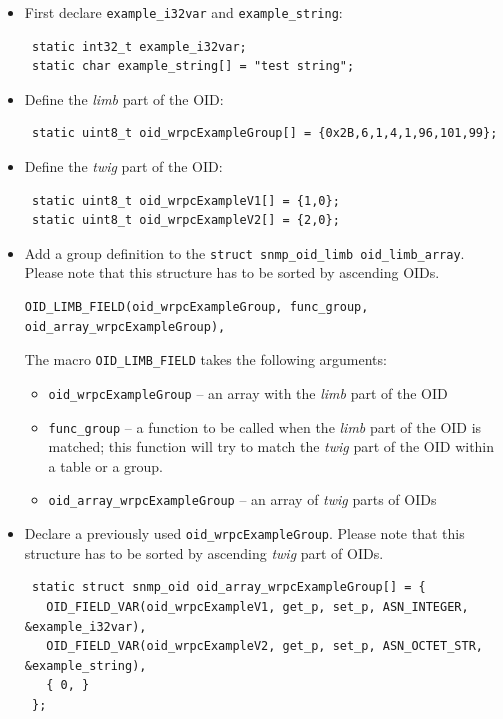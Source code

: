 \documentclass[a4paper, 12pt]{article}
\begin{document}
\begin{itemize}
\item First declare \texttt{example\_i32var} and \texttt{example\_string}:
\begin{lstlisting}
 static int32_t example_i32var;
 static char example_string[] = "test string";
\end{lstlisting}

\item Define the \textit{limb} part of the OID:
\begin{lstlisting}
 static uint8_t oid_wrpcExampleGroup[] = {0x2B,6,1,4,1,96,101,99};
\end{lstlisting}

\item Define the \textit{twig} part of the OID:
\begin{lstlisting}
 static uint8_t oid_wrpcExampleV1[] = {1,0};
 static uint8_t oid_wrpcExampleV2[] = {2,0};
\end{lstlisting}

\item Add a group definition to the \texttt{struct snmp\_oid\_limb oid\_limb\_array}.
      Please note that this structure has to be sorted by ascending OIDs.
\begin{lstlisting}
OID_LIMB_FIELD(oid_wrpcExampleGroup, func_group, oid_array_wrpcExampleGroup),
\end{lstlisting}
The macro \texttt{OID\_LIMB\_FIELD} takes the following arguments:
\begin{itemize}
   \item \texttt{oid\_wrpcExampleGroup} -- an array with the \textit{limb} part of the
         OID
   \item \texttt{func\_group} -- a function to be called when the \textit{limb} part of
         the OID is matched; this function will try to match the \textit{twig} part
         of the OID within a table or a group.
   \item \texttt{oid\_array\_wrpcExampleGroup} -- an array of \textit{twig} parts of OIDs
\end{itemize}

\item Declare a previously used \texttt{oid\_wrpcExampleGroup}. Please note that
      this structure has to be sorted by ascending \textit{twig} part of OIDs.
\begin{lstlisting}
 static struct snmp_oid oid_array_wrpcExampleGroup[] = {
   OID_FIELD_VAR(oid_wrpcExampleV1, get_p, set_p, ASN_INTEGER,   &example_i32var),
   OID_FIELD_VAR(oid_wrpcExampleV2, get_p, set_p, ASN_OCTET_STR, &example_string),
   { 0, }
 };
\end{lstlisting}


\end{itemize}
\end{document}
